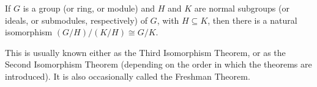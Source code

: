 \documentclass[12pt]{article}
\begin{document}

If $G$ is a group (or ring, or module) and $H$ and $K$ are normal subgroups (or ideals, or submodules, respectively) of $G$, with $H\subseteq K$, then there is a natural isomorphism $(G/H)/(K/H)\cong G/K$.

This is usually known either as the Third Isomorphism Theorem, or as the Second Isomorphism Theorem (depending on the order in which the theorems are introduced). It is also occasionally called the Freshman Theorem.
\end{document}
